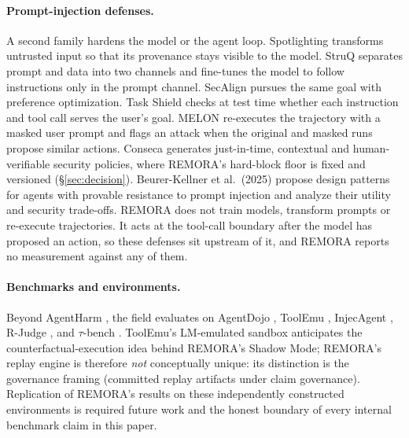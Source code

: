 \documentclass[10pt,twocolumn]{article}
\begin{document}
\paragraph{Prompt-injection defenses.}
A second family hardens the model or the agent loop. Spotlighting
\cite{hines2024spotlighting} transforms untrusted input so that its
provenance stays visible to the model. StruQ \cite{chen2025struq}
separates prompt and data into two channels and fine-tunes the model to
follow instructions only in the prompt channel. SecAlign
\cite{chen2025secalign} pursues the same goal with preference
optimization. Task Shield \cite{jia2025taskshield} checks at test time
whether each instruction and tool call serves the user's goal. MELON
\cite{zhu2025melon} re-executes the trajectory with a masked user prompt
and flags an attack when the original and masked runs propose similar
actions. Conseca \cite{tsai2025conseca} generates just-in-time,
contextual and human-verifiable security policies, where REMORA's
hard-block floor is fixed and versioned (\S\ref{sec:decision}).
Beurer-Kellner et al.\ (2025) \cite{beurerkellner2025patterns} propose
design patterns for agents with provable resistance to prompt injection
and analyze their utility and security trade-offs. REMORA does not train
models, transform prompts or re-execute trajectories. It acts at the
tool-call boundary after the model has proposed an action, so these
defenses sit upstream of it, and REMORA reports no measurement against
any of them.

\paragraph{Benchmarks and environments.}
Beyond AgentHarm \cite{andriushchenko2024agentharm}, the field evaluates
on AgentDojo \cite{debenedetti2024agentdojo}, ToolEmu
\cite{ruan2024toolemu}, InjecAgent \cite{zhan2024injecagent}, R-Judge
\cite{yuan2024rjudge}, and $\tau$-bench \cite{yao2024taubench}. ToolEmu's
LM-emulated sandbox anticipates the counterfactual-execution idea behind
REMORA's Shadow Mode; REMORA's replay engine is therefore \emph{not}
conceptually unique: its distinction is the governance framing (committed
replay artifacts under claim governance). Replication of REMORA's results
on these independently constructed environments is required future work
and the honest boundary of every internal benchmark claim in this paper.
\end{document}
